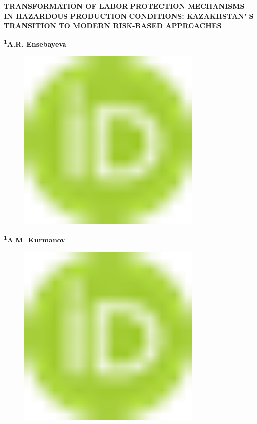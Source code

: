 
{\bfseries TRANSFORMATION OF LABOR PROTECTION MECHANISMS IN HAZARDOUS
PRODUCTION CONDITIONS: KAZAKHSTAN' S TRANSITION TO MODERN
RISK-BASED APPROACHES}

{\bfseries \textsuperscript{1}A.R. Ensebayeva\textsuperscript{\envelope }}
\begin{figure}[H]
	\centering
	\includegraphics[width=0.8\textwidth]{media/gorn/image1}
	\caption*{}
\end{figure}

{\bfseries \textsuperscript{1}A.M. Kurmanov}
\begin{figure}[H]
	\centering
	\includegraphics[width=0.8\textwidth]{media/gorn/image1}
	\caption*{}
\end{figure}

